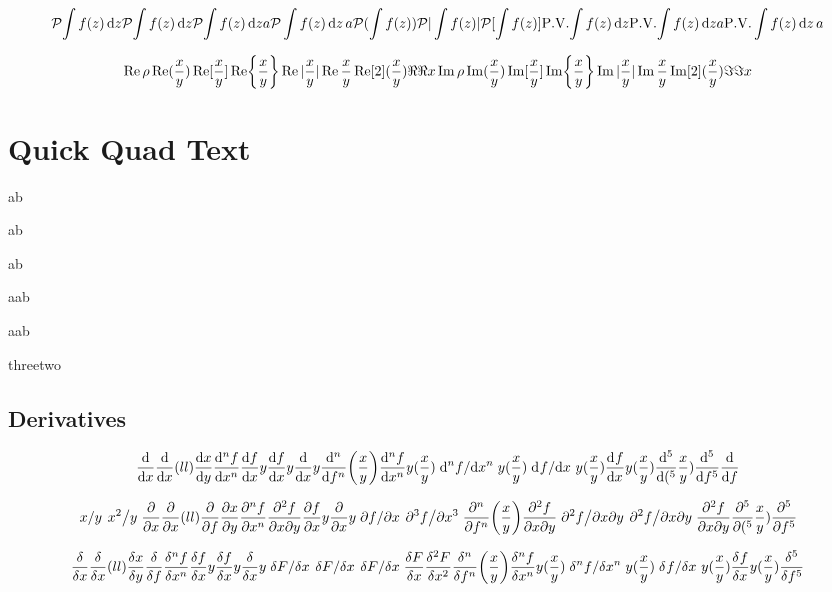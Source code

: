 \documentclass{article}
\begin{document}
\[
  \principalvalue{\int f(z) \dd{z}}
  \pv{\int f(z) \dd{z}}
  \pv{\int f(z) \dd{z}}a
  \pv\int f(z) \dd{z}a
  \pv(\int f(z))
  \pv|\int f(z)|
  \pv[\int f(z)]
  \PV{\int f(z) \dd{z}}
  \PV{\int f(z) \dd{z}}a
  \PV\int f(z) \dd{z}a
\]

\[
  \Re\rho
  \Re(\frac{x}{y})
  \Re[\frac{x}{y}]
  \Re{\frac{x}{y}}
  \Re|\frac{x}{y}|
  \Re \frac{x}{y}
  \Re[2](\frac{x}{y})
  \real
  \real{x}
  \Im\rho
  \Im(\frac{x}{y})
  \Im[\frac{x}{y}]
  \Im{\frac{x}{y}}
  \Im|\frac{x}{y}|
  \Im \frac{x}{y}
  \Im[2](\frac{x}{y})
  \imaginary
  \imaginary{x}
\]


\newpage
\section*{Quick Quad Text}

\qcc
\qand
a\qc b

ab

ab

a\qqtext ab

a\qqtext* ab

three\qif two



\newpage
\subsection*{Derivatives}

\[
  \dv x
  \dv x(ll)
  \dv{x}{y}
  \dv[n]{f}{x}
  \dv{f}{x}{y}
  \dv{f}{x}y
  \dv{x}y
  \dv[n]{f}(\frac{x}{y})
  \dv[n]{f}{x}{y}(\frac{x}{y})
  \dv*[n]{f}{x}{y}(\frac{x}{y})
  \dv*[]{f}{x}{y}(\frac{x}{y})
  \dv[]{f}{x}{y}(\frac{x}{y})
  \dv[5](\frac{x}{y})
  \dv[5]{f}
  \dv{f}
\]

\[
  \flatfrac{x}{y}
  \flatfrac{x^2}{y}
  \pdv x
  \pdv x(ll)
  \pdv{f}
  \pdv{x}{y}
  \pdv[n]{f}{x}
  \pdv{f}{x}{y}
  \pdv{f}{x}y
  \pdv{x}y
  \pdv*{f}{x}
  \pdv*[3]{f}{x}
  \pdv[n]{f}(\frac{x}{y})
  \pdv[n]{f}{x}{y}(\frac{x}{y})
  \pdv*[n]{f}{x}{y}(\frac{x}{y})
  \pdv*[]{f}{x}{y}(\frac{x}{y})
  \pdv[]{f}{x}{y}(\frac{x}{y})
  \pdv[5](\frac{x}{y})
  \pdv[5]{f}
\]

\[
  \fdv x
  \fdv x(ll)
  \fdv{x}{y}
  \fdv{f}
  \fdv[n]{f}{x}
  \fdv{f}{x}{y}
  \fdv{f}{x}y
  \fdv{x}y
  \functionalderivative*{F}{x}
  \fderivative*{F}{x}
  \fdv*{F}{x}
  \fdv{F}{x}
  \fdv[2]{F}{x}
  \fdv[n]{f}(\frac{x}{y})
  \fdv[n]{f}{x}{y}(\frac{x}{y})
  \fdv*[n]{f}{x}{y}(\frac{x}{y})
  \fdv*[]{f}{x}{y}(\frac{x}{y})
  \fdv[]{f}{x}{y}(\frac{x}{y})
  \fdv[5]{f}
\]
\end{document}
